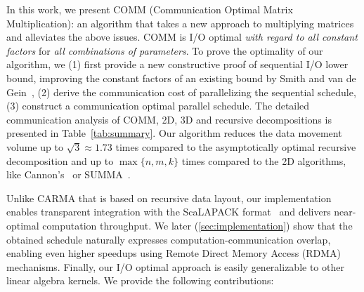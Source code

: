 \documentclass[sigplan,review,anonymous,10pt]{acmart}\settopmatter{printfolios=true,printccs=false,printacmref=false}
\newcommand\greg[1]{\textcolor{blue}{[Greg: #1]}}
\newcommand\mac[1]{\textcolor{red}{[Mac: #1]}}
\begin{document}

In this work, we present COMM (Communication Optimal Matrix Multiplication): 
an algorithm that takes a new approach to multiplying
matrices and alleviates the above issues. COMM is I/O optimal \emph{with regard 
to all constant factors}
for \emph{all combinations of parameters}.
%
To prove the optimality of our algorithm,  we (1) first provide a new 
constructive proof of sequential I/O lower bound, improving the constant 
factors of an existing bound 
by Smith and van de Gein~\cite{tightMMM}, (2) derive the communication cost of  
parallelizing the sequential
schedule, (3) construct a
communication optimal parallel schedule. 
The detailed communication analysis of COMM, 2D, 3D and 
recursive decompositions is
presented in Table~\ref{tab:summary}. Our algorithm reduces the data 
movement volume up to $\sqrt{3} \approx 1.73$ times compared to the 
asymptotically optimal recursive decomposition and up to 
$\max\{n,m,k\}$ times compared to the 2D
algorithms, like Cannon's~\cite{generalCannon} or SUMMA~\cite{summa}.


Unlike CARMA that is based on recursive data layout, our implementation
enables transparent integration with the ScaLAPACK
format~\cite{scalapackLayout} and delivers near-optimal computation throughput.
%
We later (\cref{sec:implementation}) show that the obtained schedule 
naturally expresses
computation-communication overlap, 
%
%
enabling even higher speedups
using Remote Direct Memory Access (RDMA) mechanisms.
%
%
Finally, our I/O optimal approach is
easily generalizable to other linear algebra kernels. 
%
We provide the following contributions:
\end{document}

